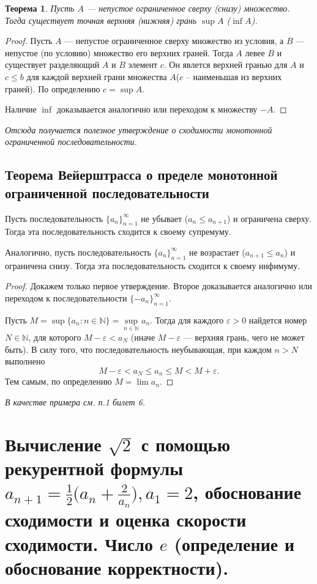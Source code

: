 \documentclass[12pt]{article}
\newtheorem{theorem}{Теорема}%
\theoremstyle{definition}
\begin{document}
\begin{theorem}
Пусть $A$ --- непустое ограниченное сверху (снизу)
множество. Тогда существует точная верхняя (нижняя)
грань $\sup A$ ($\inf A$).
\end{theorem}

\begin{proof}
Пусть $A$ --- непустое ограниченное сверху множество из условия,
а $B$ --- непустое (по условию) множество его верхних граней.
Тогда $A$ левее $B$ и существует разделяющий $A$ и $B$ элемент $c$.
Он явлется верхней гранью для $A$ и $c\le b$ для каждой верхней грани множества $A$($c$ -- наименьшая из верхних граней).
По определению $c=\sup A$.

Наличие $\inf$ доказывается аналогично или переходом к множеству $-A$.
\end{proof}
\textit{
Отсюда получается полезное утверждение о сходимости монотонной ограниченной последовательности.}
\subsection{Теорема Вейерштрасса о пределе монотонной ограниченной последовательности} 
Пусть последовательность $\{a_n\}_{n=1}^\infty$ не убывает ($a_n\le a_{n+1}$)
и ограничена сверху. Тогда эта последовательность сходится к своему супремуму.

Аналогично, пусть последовательность $\{a_n\}_{n=1}^\infty$ не возрастает ($a_{n+1}\le a_n$)
и ограничена снизу. Тогда эта последовательность сходится к своему инфимуму.

\begin{proof}
Докажем только первое утверждение.
Второе доказывается аналогично или переходом к последовательности $\{-a_n\}_{n=1}^\infty$.

Пусть $M=\sup\{a_n\colon n\in \mathbb{N}\} = \sup\limits_{n\in \mathbb{N}}a_n$.
Тогда для каждого $\varepsilon>0$ найдется номер $N\in \mathbb{N}$, для которого
$M-\varepsilon< a_N$ (иначе $M-\varepsilon$ --- верхняя грань, чего не может быть).
В силу того, что последовательность неубывающая, при каждом $n>N$ выполнено
$$M-\varepsilon< a_N\le a_n\le M< M+\varepsilon.$$
Тем самым, по определению $M=\lim a_n$.
\end{proof}
\textit{В качестве примера см. п.1 билет 6.}

\section{Вычисление $\sqrt{2}$ с помощью рекурентной формулы $a_{n+1}=\frac{1}{2}\bigl(a_n + \frac{2}{a_n}\bigr), a_1 = 2$, обоснование сходимости и оценка скорости сходимости. Число $e$ (определение и обоснование корректности).}
\end{document}
